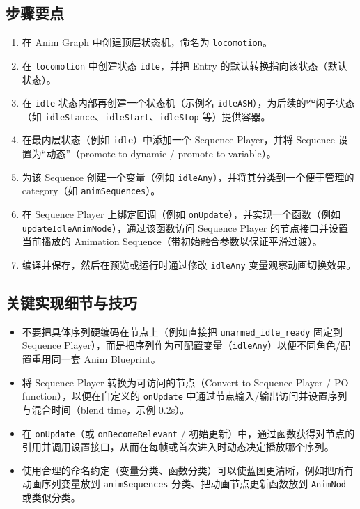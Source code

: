 \documentclass[10pt,CJKmath]{zhbook-v1}
\newcommand{\il}[1]{\texttt{#1}}%
\begin{document}
\subsection{步骤要点}
\begin{enumerate}
  \item 在 Anim Graph 中创建顶层状态机，命名为 \il{locomotion}。
  \item 在 \il{locomotion} 中创建状态 \il{idle}，并把 Entry 的默认转换指向该状态（默认状态）。
  \item 在 \il{idle} 状态内部再创建一个状态机（示例名 \il{idleASM}），为后续的空闲子状态（如 \il{idleStance}、\il{idleStart}、\il{idleStop} 等）提供容器。
  \item 在最内层状态（例如 \il{idle}）中添加一个 Sequence Player，并将 Sequence 设置为“动态”（promote to dynamic / promote to variable）。
  \item 为该 Sequence 创建一个变量（例如 \il{idleAny}），并将其分类到一个便于管理的 category（如 \il{animSequences}）。
  \item 在 Sequence Player 上绑定回调（例如 \il{onUpdate}），并实现一个函数（例如 \il{updateIdleAnimNode}），通过该函数访问 Sequence Player 的节点接口并设置当前播放的 Animation Sequence（带初始融合参数以保证平滑过渡）。
  \item 编译并保存，然后在预览或运行时通过修改 \il{idleAny} 变量观察动画切换效果。
\end{enumerate}

\subsection{关键实现细节与技巧}
\begin{itemize}
  \item 不要把具体序列硬编码在节点上（例如直接把 \il{unarmed_idle_ready} 固定到 Sequence Player），而是把序列作为可配置变量（\il{idleAny}）以便不同角色/配置重用同一套 Anim Blueprint。
  \item 将 Sequence Player 转换为可访问的节点（Convert to Sequence Player / PO function），以便在自定义的 \il{onUpdate} 中通过节点输入/输出访问并设置序列与混合时间（blend time，示例 0.2s）。
  \item 在 \il{onUpdate}（或 \il{onBecomeRelevant} / 初始更新）中，通过函数获得对节点的引用并调用设置接口，从而在每帧或首次进入时动态决定播放哪个序列。
  \item 使用合理的命名约定（变量分类、函数分类）可以使蓝图更清晰，例如把所有动画序列变量放到 \il{animSequences} 分类、把动画节点更新函数放到 \il{AnimNod} 或类似分类。
\end{itemize}
\end{document}
